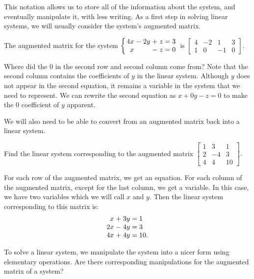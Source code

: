 This notation allows us to store all of the information about the system, and eventually manipulate it, with less writing. As a first step in solving linear systems, we will usually consider the system's augmented matrix.

\begin{example}
	The augmented matrix for the system 
		$\left\{
			\arraycolsep=1.4pt
			\begin{array}{rcrcrl}
				4x &-& 2y &+& z &= 3\\
						x &&&-& z &= 0
		\end{array}\right.$
		is $\begin{bmatrix} 4 & -2 & 1 & 3 \\ 1 & 0 & -1 & 0\end{bmatrix}$.
		
		Where did the $0$ in the second row and second column come from? Note that the second column contains the coefficients of $y$ in the linear system. Although $y$ does not appear in the second equation, it remains a variable in the system that we need to represent. We can rewrite the second equation as $x +0y - z = 0$ to make the $0$ coefficient of $y$ apparent.
\end{example}

We will also need to be able to convert from an augmented matrix back into a linear system.

\begin{example}
	Find the linear system corresponding to the augmented matrix 
	$\begin{bmatrix} 1 & 3 & 1\\ 2 & -4 & 3\\4 & 4 & 10\end{bmatrix}.$

	For each row of the augmented matrix, we get an equation. For each column of the augmented matrix, except for the last column, we get a variable. In this case, we have two variables which we will call $x$ and $y$. Then the linear system corresponding to this matrix is:
	\[
	\arraycolsep=1.4pt
	\begin{array}{rcrl}
		x & + & 3y & = 1\\
		2x & - & 4y & = 3\\
		4x & + & 4y & = 10.
	\end{array}
	\]
\end{example}

To solve a linear system, we manipulate the system into a nicer form using elementary operations. Are there corresponding manipulations for the augmented matrix of a system?

